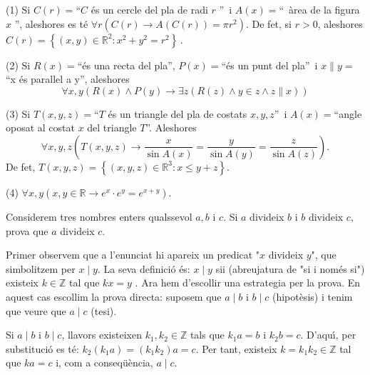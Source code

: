 \begin{solucio}
(1) Si $C(r)=$\textquotedblleft$C$ \'{e}s un cercle del pla de radi $r$%
\textquotedblright\ i $A(x)=$\textquotedblleft\ \`{a}rea de la figura $x$%
\textquotedblright, aleshores es t\'{e} $\forall r\left( C(r)\longrightarrow
A(C(r))=\pi r^{2}\right) $. De fet, si $r>0$, aleshores $C(r)=\left\{ \left(
x,y\right) \in\mathbb{R}^{2}:x^{2}+y^{2}=r^{2}\right\} \,$.

(2) Si $R(x)=$\textquotedblleft\'{e}s una recta del pla\textquotedblright, $%
P(x)=$\textquotedblleft\'{e}s un punt del pla\textquotedblright\ i $%
x\parallel y=$\textquotedblleft x \'{e}s paral\textperiodcentered lel a
y\textquotedblright, aleshores%
\begin{equation*}
\forall x,y\left( R(x)\wedge P(y)\longrightarrow\exists z\left( R(z)\wedge
y\in z\wedge z\parallel x\right) \right)
\end{equation*}

(3) Si $T(x,y,z)=$\textquotedblleft$T$ \'{e}s un triangle del pla de costats
$x,y,z$\textquotedblright\ i $A(x)=$\textquotedblleft angle oposat al costat
$x$ del triangle $T$\textquotedblright. Aleshores%
\begin{equation*}
\forall x,y,z\left( T(x,y,z)\longrightarrow\frac{x}{\sin A(x)}=\frac{y}{\sin
A(y)}=\frac{z}{\sin A(z)}\right) \text{.}
\end{equation*}
De fet, $T(x,y,z)=\left\{ (x,y,z)\in\mathbb{R}^{3}:x\leq y+z\right\} $.

(4) $\forall x,y\left( x,y\in\mathbb{R}\longrightarrow e^{x}\cdot
e^{y}=e^{x+y}\right) $.
\end{solucio}

\begin{exemple}
Considerem tres nombres enters qualssevol $a,b$ i $c$. Si $a$ divideix $b$ i
$b$ divideix $c$, prova que $a$ divideix $c$.
\end{exemple}

\begin{solucio}
Primer observem que a l'enunciat hi apareix un predicat "$x$ divideix $y$",
que simbolitzem per $x\mid y$. La seva definici\'{o} \'{e}s: $x\mid y$ sii
(abreujatura de "si i nom\'{e}s si") existeix $k\in\mathbb{Z}$ tal que $kx=y$%
. Ara hem d'escollir una estrategia per la prova. En aquest cas escollim la
prova directa: suposem que $a\mid b$ i $b\mid c$ (hipot\`{e}sis) i tenim que
veure que $a\mid c$ (tesi).

Si $a\mid b$ i $b\mid c$, llavors existeixen $k_{1},k_{2}\in\mathbb{Z}$ tals
que $k_{1}a=b$ i $k_{2}b=c$. D'aqu\'{\i}, per substituci\'{o} es t\'{e}: $%
k_{2}\left( k_{1}a\right) =\left( k_{1}k_{2}\right) a=c$. Per tant, existeix
$k=k_{1}k_{2}\in\mathbb{Z}$ tal que $ka=c$ i, com a conseq\"{u}\`{e}ncia, $%
a\mid c$.
\end{solucio}

